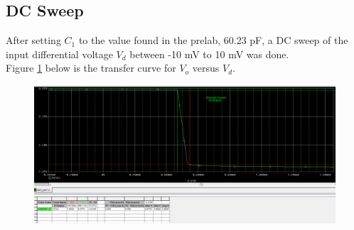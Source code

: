 \documentclass{article}
\begin{document}
	\subsection{DC Sweep}	
	After setting $C_1$ to the value found in the prelab, 60.23 pF, a DC sweep of the input differential voltage $V_d$ between -10 mV to 10 mV was done.\\
	Figure \ref{f:6} below is the transfer curve for $V_o$ versus $V_d$.
	\begin{figure}[!ht]
		\centering
		\includegraphics[width=0.7\textheight]{1.1.png}
		\label{f:6}
	\end{figure}
\end{document}
